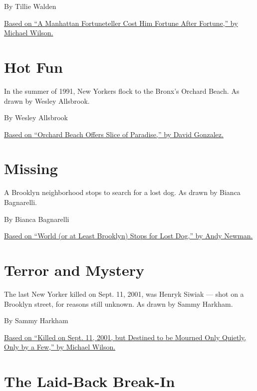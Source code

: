 By Tillie Walden

\href{https://www.nytimes3xbfgragh.onion/2015/06/06/nyregion/he-went-to-the-fortuneteller-now-his-fortune-is-gone.html}{Based
on ``A Manhattan Fortuneteller Cost Him Fortune After Fortune,'' by
Michael Wilson.}

\hypertarget{hot-fun}{%
\section{Hot Fun}\label{hot-fun}}

In the summer of 1991, New Yorkers flock to the Bronx's Orchard Beach.
As drawn by Wesley Allsbrook.

By Wesley Allsbrook

\href{http://www.nytimes3xbfgragh.onion/1991/07/01/nyregion/orchard-beach-offers-slice-of-paradise.html}{Based
on ``Orchard Beach Offers Slice of Paradise,'' by David Gonzalez.}

\hypertarget{missing}{%
\section{Missing}\label{missing}}

A Brooklyn neighborhood stops to search for a lost dog. As drawn by
Bianca Bagnarelli.

By Bianca Bagnarelli

\href{https://www.nytimes3xbfgragh.onion/2016/11/13/nyregion/world-or-at-least-brooklyn-stops-for-lost-dog.html}{Based
on ``World (or at Least Brooklyn) Stops for Lost Dog,'' by Andy Newman.}

\hypertarget{terror-and-mystery}{%
\section{Terror and Mystery}\label{terror-and-mystery}}

The last New Yorker killed on Sept. 11, 2001, was Henryk Siwiak --- shot
on a Brooklyn street, for reasons still unknown. As drawn by Sammy
Harkham.

By Sammy Harkham

\href{http://www.nytimes3xbfgragh.onion/2011/09/10/nyregion/brooklyn-murder-on-sept-11-2001-remains-unsolved.html}{Based
on ``Killed on Sept. 11, 2001, but Destined to be Mourned Only Quietly,
Only by a Few,'' by Michael Wilson.}

\hypertarget{the-laid-back-break-in}{%
\section{The Laid-Back Break-In}\label{the-laid-back-break-in}}

